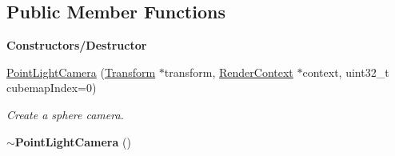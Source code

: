 \subsection*{Public Member Functions}
\begin{Indent}\textbf{ Constructors/\+Destructor}\par
\begin{DoxyCompactItemize}
\item 
\mbox{\label{classrev_1_1_point_light_camera_a58b34e47670fcad9104f12b5dfef976d}} 
\mbox{\hyperlink{classrev_1_1_point_light_camera_a58b34e47670fcad9104f12b5dfef976d}{Point\+Light\+Camera}} (\mbox{\hyperlink{classrev_1_1_transform}{Transform}} $\ast$transform, \mbox{\hyperlink{classrev_1_1_render_context}{Render\+Context}} $\ast$context, uint32\+\_\+t cubemap\+Index=0)
\begin{DoxyCompactList}\small\item\em Create a sphere camera. \end{DoxyCompactList}\item 
\mbox{\label{classrev_1_1_point_light_camera_a18cea2dcf1031f20ae92fce06fe4d69b}} 
{\bfseries $\sim$\+Point\+Light\+Camera} ()
\end{DoxyCompactItemize}
\end{Indent}

